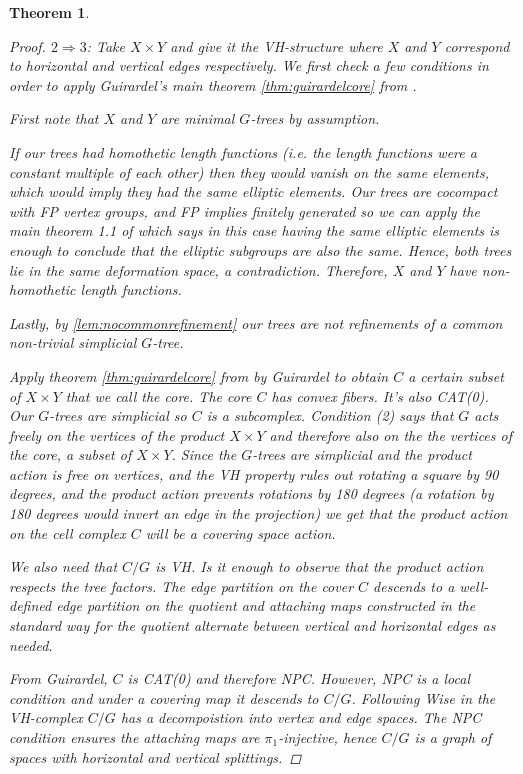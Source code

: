 \documentclass[12pt,parskip=full]{report}
\theoremstyle{plain}
\newtheorem{thm}{Theorem}[section]
\theoremstyle{definition}
\begin{document}
\begin{thm}
\begin{proof}
$2\Rightarrow 3$: Take $X \times Y$ and give it the VH-structure where $X$ and $Y$ correspond to horizontal and vertical edges respectively. We first check a few conditions in order to apply Guirardel's main theorem \ref{thm:guirardelcore} from \cite{guirardelcorepaper}. 
    
    First note that $X$ and $Y$ are minimal $G$-trees by assumption.
    
    If our trees had homothetic length functions (i.e. the length functions were a constant multiple of each other) then they would vanish on the same elements, which would imply they had the same elliptic elements. Our trees are cocompact with FP vertex groups, and FP implies finitely generated so we can apply the main theorem 1.1 of \cite{foresterdeformationrigidity} which says in this case having the same elliptic elements is enough to conclude that the elliptic subgroups are also the same. Hence, both trees lie in the same deformation space, a contradiction. Therefore, \(X\) and \(Y\) have non-homothetic length functions.
    
    Lastly, by \ref{lem:nocommonrefinement} our trees are not refinements of a common non-trivial simplicial $G$-tree.
    
    Apply theorem \ref{thm:guirardelcore} from \cite{guirardelcorepaper} by Guirardel to obtain $C$ a certain subset of $X \times Y$ that we call the core. The core \(C\) has convex fibers. It's also CAT(0). Our \(G\)-trees are simplicial so \(C\) is a subcomplex. Condition (2) says that $G$ acts freely on the vertices of the product $X\times Y$ and therefore also on the the vertices of the core, a subset of $X \times Y$. Since the \(G\)-trees are simplicial and the product action is free on vertices, and the VH property rules out rotating a square by 90 degrees, and the product action prevents rotations by 180 degrees (a rotation by 180 degrees would invert an edge in the projection) we get that the product action on the cell complex \(C\) will be a covering space action.
    
    We also need that $C/G$ is VH. Is it enough to observe that the product action respects the tree factors. The edge partition on the cover \(C\) descends to a well-defined edge partition on the quotient and attaching maps constructed in the standard way for the quotient alternate between vertical and horizontal edges as needed.
    
    From Guirardel, \(C\) is CAT(0) and therefore NPC. However, NPC is a local condition and under a covering map it descends to \(C/G\). Following Wise in \cite{wisethesis} the VH-complex \(C/G\) has a decompoistion into vertex and edge spaces. The NPC condition ensures the attaching maps are \(\pi_1\)-injective, hence \(C/G\) is a graph of spaces with horizontal and vertical splittings.
    

\end{proof}
\end{thm}
\end{document}
